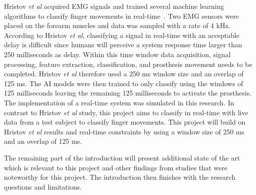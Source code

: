 Hristov \textit{et al} acquired EMG signals and trained several machine learning algorithms to classify finger movements in real-time~\cite{hristovClassificationIndividualCombined2022}. Two EMG sensors were placed on the forearm muscles and data was sampled with a rate of 4 kHz. According to Hristov \textit{et al}, classifying a signal in real-time with an acceptable delay is difficult since humans will perceive a system response time larger than 250 milliseconds as delay. Within this time window data acquisition, signal processing, feature extraction, classification, and prosthesis movement needs to be completed. Hristov \textit{et al} therefore used a 250 ms window size and an overlap of 125 ms. The AI models were then trained to only classify using the windows of 125 milliseconds leaving the remaining 125 milliseconds to activate the prosthesis. The implementation of a real-time system was simulated in this research. In contrast to Hristov \textit{et al} study, this project aims to classify in real-time with live data from a test subject to classify finger movements. This project will build on Hristov \textit{et al} results and real-time constraints by using a window size of 250 ms and an overlap of 125 ms.   
    



\label{section:state-of-the-art}
The remaining part of the introduction will present additional state of the art which is relevant to this project and other findings from studies that were noteworthy for this project. The introduction then finishes with the research questions and limitations.


